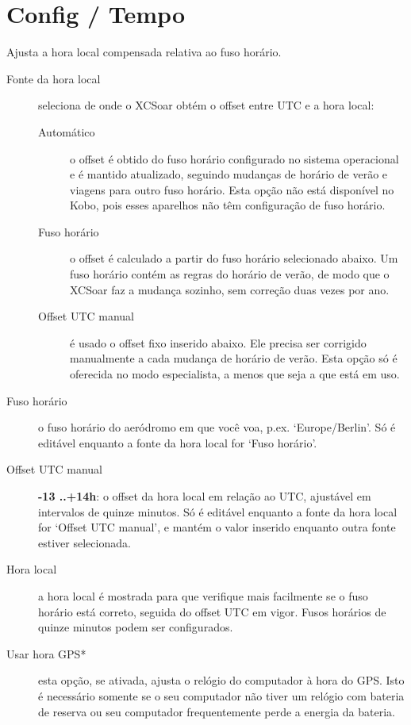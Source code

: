 \section{Config / Tempo}

Ajusta a hora local compensada relativa ao fuso horário.

\begin{description}
\item[Fonte da hora local]  seleciona de onde o XCSoar obtém o offset entre UTC e a
  hora local:
  \begin{description}
  \item[Automático]  o offset é obtido do fuso horário configurado no sistema
    operacional e é mantido atualizado, seguindo mudanças de horário de verão e
    viagens para outro fuso horário.  Esta opção não está disponível no Kobo, pois
    esses aparelhos não têm configuração de fuso horário.
  \item[Fuso horário]  o offset é calculado a partir do fuso horário selecionado
    abaixo.  Um fuso horário contém as regras do horário de verão, de modo que o
    XCSoar faz a mudança sozinho, sem correção duas vezes por ano.
  \item[Offset UTC manual]  é usado o offset fixo inserido abaixo.  Ele precisa ser
    corrigido manualmente a cada mudança de horário de verão.  Esta opção só é
    oferecida no modo especialista, a menos que seja a que está em uso.
  \end{description}
\item[Fuso horário]  o fuso horário do aeródromo em que você voa, p.ex.
  `Europe/Berlin'.  Só é editável enquanto a fonte da hora local for `Fuso horário'.
\item[Offset UTC manual]  {\bf -13 ..+14h}: o offset da hora local em relação ao
  UTC, ajustável em intervalos de quinze minutos.  Só é editável enquanto a fonte
  da hora local for `Offset UTC manual', e mantém o valor inserido enquanto outra
  fonte estiver selecionada.
\item[Hora local]  a hora local é mostrada para que verifique mais facilmente se o fuso horário está correto, seguida do offset UTC em vigor.  Fusos horários de quinze minutos podem ser configurados.
\item[Usar hora GPS*] esta opção, se ativada, ajusta o relógio do computador à hora do GPS.  Isto é necessário somente se o seu computador não tiver um relógio com bateria de reserva ou seu computador frequentemente perde a energia da bateria.
\end{description}



